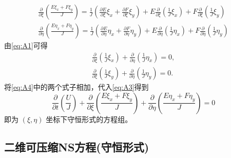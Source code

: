 \documentclass[12pt]{article}
\begin{document}
\begin{equation}
	\begin{aligned}
		\frac{\partial}{\partial \xi}\left(\frac{E \xi_{x}+F \xi_{y}}{J}\right)=\frac{1}{J}\left(\frac{\partial E}{\partial \xi} \xi_{x}+\frac{\partial F}{\partial \xi} \xi_{y}\right)+E \frac{\partial}{\partial \xi}\left(\frac{1}{J} \xi_{x}\right)+F \frac{\partial}{\partial \xi}\left(\frac{1}{J} \xi_{y}\right) \\
		\frac{\partial}{\partial \eta}\left(\frac{E \eta_{x}+F \eta_{y}}{J}\right)=\frac{1}{J}\left(\frac{\partial E}{\partial \eta} \eta_{x}+\frac{\partial F}{\partial \eta} \eta_{y}\right)+E \frac{\partial}{\partial \eta}\left(\frac{1}{J} \eta_{x}\right)+F \frac{\partial}{\partial \eta}\left(\frac{1}{J} \eta_{y}\right)
	\end{aligned}
	\label{eq:A4}
\end{equation}
由\cref{eq:A1}可得
\begin{equation}
	\begin{aligned}
		\frac{\partial}{\partial \xi}\left(\frac{1}{J} \xi_{x}\right)+\frac{\partial}{\partial \eta}\left(\frac{1}{J} \eta_{x}\right)=0, \\
		\frac{\partial}{\partial \xi}\left(\frac{1}{J} \xi_{y}\right)+\frac{\partial}{\partial \eta}\left(\frac{1}{J} \eta_{y}\right)=0 .
	\end{aligned}
\end{equation}
将\cref{eq:A4}中的两个式子相加，代入\cref{eq:A3}得到
\begin{equation}
	\frac{\partial}{\partial t}\left(\frac{U}{J}\right)+\frac{\partial}{\partial \xi}\left(\frac{E \xi_{x}+F \xi_{y}}{J}\right)+\frac{\partial}{\partial \eta}\left(\frac{E \eta_{x}+F \eta_{y}}{J}\right)=0
	\label{eq:A5}
\end{equation}
即为 $(\xi, \eta)$ 坐标下守恒形式的方程组。\cite[P28]{cfd}


\subsection{二维可压缩NS方程(守恒形式)}
\end{document}
